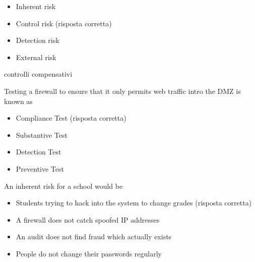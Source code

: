 \begin{itemize}
\item Inherent risk
\item Control risk (risposta corretta)
\item Detection risk
\item External risk
\end{itemize}

controlli compensativi


Testing a firewall to ensure that it only permits web traffic intro the DMZ is
known as

\begin{itemize}
\item Compliance Test (risposta corretta)
\item Substantive Test
\item Detection Test
\item Preventive Test
\end{itemize}


An inherent risk for a school would be

\begin{itemize}
\item Students trying to hack into the system to change grades (risposta
corretta)
\item A firewall does not catch spoofed IP addresses
\item An audit does not find fraud which actually exists
\item People do not change their passwords regularly
\end{itemize}
